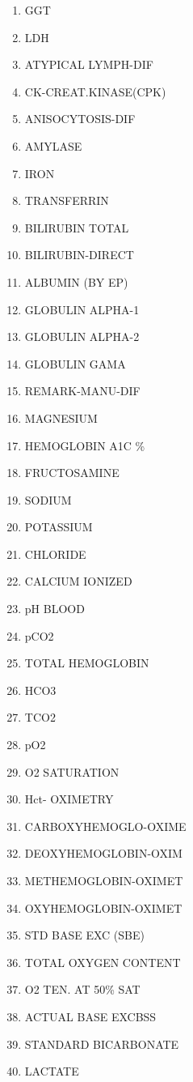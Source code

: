 \documentclass[a4paper,12pt]{article}
\begin{document}
\begin{appendices}
\begin{enumerate}
   			\item GGT
   			\item LDH
   			\item ATYPICAL LYMPH-DIF
   			\item CK-CREAT.KINASE(CPK)
   			\item ANISOCYTOSIS-DIF
   			\item AMYLASE
   			\item IRON
   			\item TRANSFERRIN
   			\item BILIRUBIN TOTAL
   			\item BILIRUBIN-DIRECT
   			\item ALBUMIN (BY EP)
   			\item GLOBULIN ALPHA-1
   			\item GLOBULIN ALPHA-2
   			\item GLOBULIN GAMA
   			\item REMARK-MANU-DIF
   			\item MAGNESIUM
   			\item HEMOGLOBIN A1C \%
   			\item FRUCTOSAMINE
   			\item SODIUM
   			\item POTASSIUM
   			\item CHLORIDE
   			\item CALCIUM IONIZED
   			\item pH BLOOD
   			\item pCO2
   			\item TOTAL HEMOGLOBIN
   			\item HCO3
   			\item TCO2
   			\item pO2
   			\item O2 SATURATION
   			\item Hct- OXIMETRY
   			\item CARBOXYHEMOGLO-OXIME
   			\item DEOXYHEMOGLOBIN-OXIM
   			\item METHEMOGLOBIN-OXIMET
   			\item OXYHEMOGLOBIN-OXIMET
   			\item STD BASE EXC (SBE)
   			\item TOTAL OXYGEN CONTENT
   			\item O2 TEN. AT 50\% SAT
   			\item ACTUAL BASE EXCBSS
   			\item STANDARD BICARBONATE
   			\item LACTATE

\end{enumerate}
\end{appendices}
\end{document}
